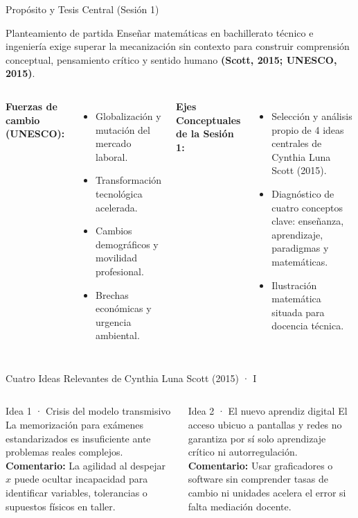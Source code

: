 \documentclass[aspectratio=169,spanish,xcolor=table]{beamer}
\begin{document}
\begin{frame}{Propósito y Tesis Central (Sesión 1)}
  \begin{block}{Planteamiento de partida}
    Enseñar matemáticas en bachillerato técnico e ingeniería exige superar la mecanización sin contexto para construir comprensión conceptual, pensamiento crítico y sentido humano \textbf{(Scott, 2015; UNESCO, 2015)}.
  \end{block}
  \vspace{0.3cm}
  \begin{columns}[T]
      \textbf{\color{iiiepeNavy}Fuerzas de cambio (UNESCO):}
      \begin{itemize}\scriptsize
        \item Globalización y mutación del mercado laboral.
        \item Transformación tecnológica acelerada.
        \item Cambios demográficos y movilidad profesional.
        \item Brechas económicas y urgencia ambiental.
      \end{itemize}
      \textbf{\color{iiiepeBlue}Ejes Conceptuales de la Sesión 1:}
      \begin{itemize}\scriptsize
        \item Selección y análisis propio de 4 ideas centrales de Cynthia Luna Scott (2015).
        \item Diagnóstico de cuatro conceptos clave: enseñanza, aprendizaje, paradigmas y matemáticas.
        \item Ilustración matemática situada para docencia técnica.
      \end{itemize}
  \end{columns}
\end{frame}

\begin{frame}{Cuatro Ideas Relevantes de Cynthia Luna Scott (2015) · I}
  \begin{columns}[T]
      \begin{block}{Idea 1 · Crisis del modelo transmisivo}
        La memorización para exámenes estandarizados es insuficiente ante problemas reales complejos.\\[0.2cm]
        \textbf{Comentario:} La agilidad al despejar $x$ puede ocultar incapacidad para identificar variables, tolerancias o supuestos físicos en taller.
      \end{block}
      \begin{block}{Idea 2 · El nuevo aprendiz digital}
        El acceso ubicuo a pantallas y redes no garantiza por sí solo aprendizaje crítico ni autorregulación.\\[0.2cm]
        \textbf{Comentario:} Usar graficadores o software sin comprender tasas de cambio ni unidades acelera el error si falta mediación docente.
      \end{block}
  \end{columns}
\end{frame}
\end{document}
